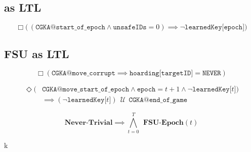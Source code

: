 \hypertarget{pcs-as-ltl}{%
\subsection{ as LTL}\label{pcs-as-ltl}}

\begin{LTL}
    $$
    \Box \Big(\, ( \texttt{CGKA@start\_of\_epoch} \land \texttt{unsafeIDs} = 0 ) \implies \neg \texttt{learnedKey[epoch]} \Big)
    $$
\end{LTL}


\hypertarget{fsu-as-ltl}{%
\subsection{FSU as LTL}\label{fsu-as-ltl}}

\begin{LTL}
    $$
    \Box \left( \texttt{CGKA@move\_corrupt} \implies \texttt{hoarding[targetID]} = \texttt{NEVER} \right)
    $$
\end{LTL}

\begin{LTL}
    \begin{equation*}
    \begin{split}
    \Diamond ( & \texttt{CGKA@move\_start\_of\_epoch} \land \texttt{epoch} = t + 1 \land \neg \texttt{learnedKey[$t$]} ) \\
    & \implies ( \neg \texttt{learnedKey[$t$]} ) \,\;{\mathcal {U}}\;\, \texttt{CGKA@end\_of\_game}
    \end{split}
    \end{equation*}
\end{LTL}

\begin{LTL}[\;FSU\;]
    $$
    \textbf{Never-Trivial} \implies \bigwedge\limits_{t=0}^{T} \;\,\textbf{FSU-Epoch}(t)
    $$
\end{LTL}
k
